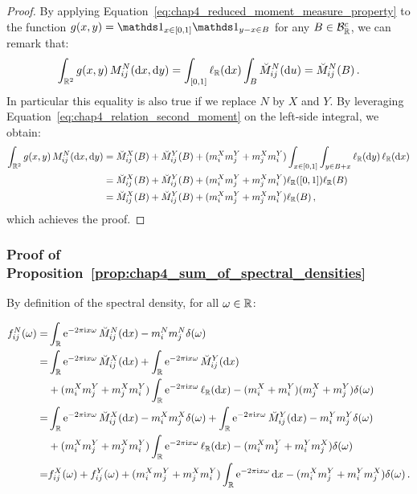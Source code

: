 \begin{subappendices}
\begin{proof}
      By applying Equation~\eqref{eq:chap4_reduced_moment_measure_property} to the function $g(x,y) = \II_{x \in [0,1]}\II_{y-x\in B}$ for any $B\in\mathcal{B}_{\mathbb R}^c$, we can remark that:
  \begin{equation*}
      \int_{{\mathbb R}^2}{g(x, y) \, M_{ij}^N(\mathrm{d}x, \mathrm{d}y)} = \int_{[0,1]}{\ell_{{\mathbb R}}(\mathrm{d}x)}\int_{B}{\breve M_{ij}^N(\mathrm{d}u)} = \breve M_{ij}^N(B)\,.
  \end{equation*}
  In particular this equality is also true if we replace $N$ by $X$ and $Y$. 
      By leveraging Equation~\eqref{eq:chap4_relation_second_moment} on the left-side integral, we obtain:
  \begin{align*}
      \int_{{\mathbb R}^2}{g(x, y) \, M_{ij}^N(\mathrm{d}x, \mathrm{d}y)} &= \breve M_{ij}^{X}(B) +  \breve M_{ij}^{Y}(B) + (m_i^X m_j^Y + m_j^X m_i^Y)\int_{x\in[0,1]}{\int_{y\in B + x}{\ell_{\mathbb R}(\mathrm{d}y)} \, \ell_{\mathbb R}(\mathrm{d}x)}  \\
      &= \breve M_{ij}^X(B) + \breve M_{ij}^Y(B)+ (m_i^X m_j^Y + m_j^X m_i^Y)\ell_{{\mathbb R}}([0,1])\ell_{{\mathbb R}}(B) \\
      &= \breve M_{ij}^X(B) + \breve M_{ij}^Y(B)+ (m_i^X m_j^Y + m_j^X m_i^Y)\ell_{{\mathbb R}}(B) \,,
  \end{align*}
  which achieves the proof.

  \end{proof}
          
\subsubsection*{Proof of Proposition~\ref{prop:chap4_sum_of_spectral_densities}}
   By definition of the spectral density, for all $\omega\in{\mathbb R}$:
   
  \begin{align}
      f_{ij}^N(\omega) = &\int_{\mathbb R} \mathrm{e}^{-2\pi \mathrm{i} x \omega} \, \breve M_{ij}^N(\mathrm{d}x) - m_i^N m_j^N \delta(\omega)\nonumber \\
      = &\int_{\mathbb R} \mathrm{e}^{-2\pi \mathrm{i} x \omega} \, \breve M_{ij}^X(\mathrm d x) + \int_{\mathbb R} \mathrm{e}^{-2\pi \mathrm{i} x \omega} \, \breve M_{ij}^Y(\mathrm d x)\nonumber  \\
      &+ (m_i^X m_j^Y + m_j^X m_i^Y) \int_{\mathbb R} \mathrm{e}^{-2\pi \mathrm{i} x \omega} \, \ell_{{\mathbb R}}(\mathrm{d}x) - (m_i^X + m_i^Y)(m_j^X + m_j^Y) \delta(\omega)\nonumber  \\
      = &\int_{\mathbb R} \mathrm{e}^{-2\pi \mathrm{i} x \omega} \, \breve M_{ij}^X(\mathrm d x) - m_i^X m_j^X \delta(\omega) + \int_{\mathbb R} \mathrm{e}^{-2\pi \mathrm{i} x \omega} \, \breve M_{ij}^Y(\mathrm d x) - m_i^Y m_j^Y \delta(\omega) \nonumber \\
      &+ (m_i^X m_j^Y + m_j^X m_i^Y) \int_{\mathbb R} \mathrm{e}^{-2\pi \mathrm{i} x \omega} \, \ell_{{\mathbb R}}(\mathrm{d}x) - (m_i^X m_j^Y + m_i^Y m_j^X) \delta(\omega) \nonumber \\
      = &f_{ij}^X(\omega) + f_{ij}^Y(\omega) + (m_i^X m_j^Y + m_j^X m_i^Y) \int_{\mathbb R} \mathrm{e}^{-2\pi \mathrm{i} x \omega} \,\mathrm{d}x - (m_i^X m_j^Y + m_i^Y m_j^X) \delta(\omega)\,.\label{eq:chap4_dirac_difference} 
    \end{align}
              

\end{subappendices}
